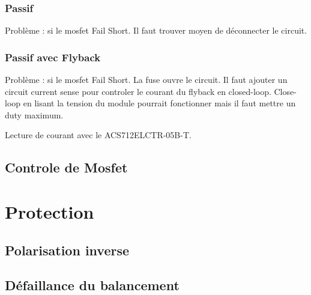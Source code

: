 \documentclass[12pt,letterpaper]{article}
\begin{document}
\begin{normalsize}
			\subsubsection{Passif}
			Probl\`{e}me : si le mosfet Fail Short. Il faut trouver moyen de d\'{e}connecter le circuit.
			\subsubsection{Passif avec Flyback}
			Probl\`{e}me : si le mosfet Fail Short. La fuse ouvre le circuit. Il faut ajouter un circuit current sense pour controler le courant du flyback en closed-loop. Close-loop en lisant la tension du module pourrait fonctionner mais il faut mettre un duty maximum.
			
			Lecture de courant avec le ACS712ELCTR-05B-T. 
			
			\subsection{Controle de Mosfet}
			
			
		
		\section{Protection}
			\subsection{Polarisation inverse}
			
			\subsection{D\'{e}faillance du balancement}
					
					
			
					
	\end{normalsize}
\end{document}
